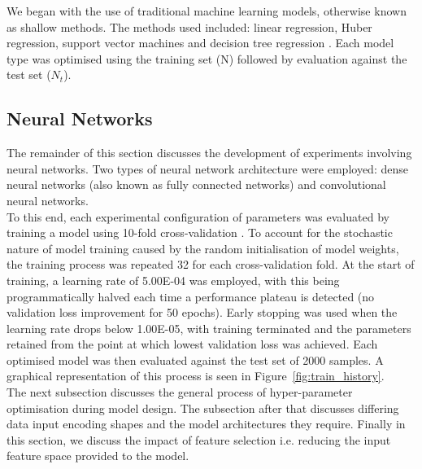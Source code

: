 We began with the use of traditional machine learning models, otherwise known as shallow methods. The methods used included: linear regression, Huber regression, support vector machines \cite{smola2004tutorial} and decision tree regression \cite{navada2011overview}. Each model type was optimised using the training set (N) followed by evaluation against the test set ($N_t$). 

\subsection{Neural Networks}

The remainder of this section discusses the development of experiments involving neural networks. Two types of neural network architecture were employed: dense neural networks (also known as fully connected networks) and convolutional neural networks.
\\

\noindent
To this end, each experimental configuration of parameters was evaluated by training a model using 10-fold cross-validation \cite{refaeilzadeh2009cross}. To account for the stochastic nature of model training caused by the random initialisation of model weights, the training process was repeated 32 for each cross-validation fold. At the start of training, a learning rate of 5.00E-04 was employed, with this being programmatically halved each time a performance plateau is detected (no validation loss improvement for 50 epochs). Early stopping \cite{yao2007early} was used when the learning rate drops below  1.00E-05, with training terminated and the parameters retained from the point at which lowest validation loss was achieved. Each optimised model was then evaluated against the test set of 2000 samples. A graphical representation of this process is seen in Figure~\ref{fig:train_history}. 
\\

\noindent
The next subsection discusses the general process of hyper-parameter optimisation during model design. The subsection after that discusses differing data input encoding shapes and the model architectures they require. Finally in this section, we discuss the impact of feature selection i.e. reducing the input feature space provided to the model.

